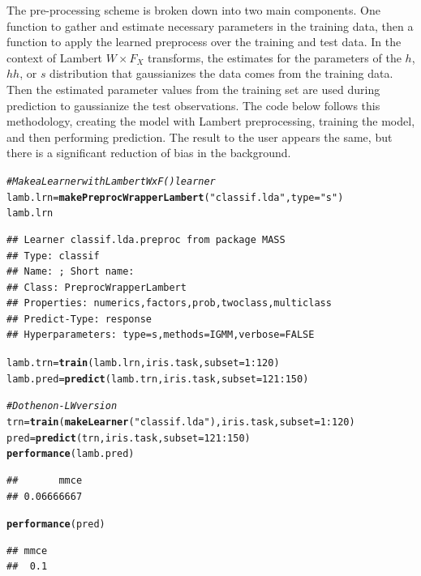 \documentclass[12pt]{article}\usepackage[]{graphicx}\usepackage[]{color}
\makeatletter
\newcommand{\hlnum}[1]{\textcolor[rgb]{0.686,0.059,0.569}{#1}}%
\newcommand{\hlstr}[1]{\textcolor[rgb]{0.192,0.494,0.8}{#1}}%
\newcommand{\hlcom}[1]{\textcolor[rgb]{0.678,0.584,0.686}{\textit{#1}}}%
\newcommand{\hlopt}[1]{\textcolor[rgb]{0,0,0}{#1}}%
\newcommand{\hlstd}[1]{\textcolor[rgb]{0.345,0.345,0.345}{#1}}%
\newcommand{\hlkwb}[1]{\textcolor[rgb]{0.69,0.353,0.396}{#1}}%
\newcommand{\hlkwc}[1]{\textcolor[rgb]{0.333,0.667,0.333}{#1}}%
\newcommand{\hlkwd}[1]{\textcolor[rgb]{0.737,0.353,0.396}{\textbf{#1}}}%
\newenvironment{kframe}{%
 \def\at@end@of@kframe{}%
 \ifinner\ifhmode%
  \def\at@end@of@kframe{\end{minipage}}%
  \begin{minipage}{\columnwidth}%
 \fi\fi%
 \def\FrameCommand##1{\hskip\@totalleftmargin \hskip-\fboxsep
 \colorbox{shadecolor}{##1}\hskip-\fboxsep
     \hskip-\linewidth \hskip-\@totalleftmargin \hskip\columnwidth}%
 \MakeFramed {\advance\hsize-\width
   \@totalleftmargin\z@ \linewidth\hsize
   \@setminipage}}%
 {\par\unskip\endMakeFramed%
 \at@end@of@kframe}
\newenvironment{knitrout}{}{} %
\theoremstyle{definition}
\makeatother
\begin{document}
The pre-processing scheme is broken down into two main components. One function to gather and estimate necessary parameters in the training data, then a function to apply the learned preprocess over the training and test data. In the context of Lambert $W\times F_X$ transforms, the estimates for the parameters of the $h$, $hh$, or $s$ distribution that gaussianizes the data comes from the training data. Then the estimated parameter values from the training set are used during prediction to gaussianize the test observations. The code below follows this methodology, creating the model with Lambert preprocessing, training the model, and then performing prediction. The result to the user appears the same, but there is a significant reduction of bias in the background.

\singlespacing
\begin{knitrout}
\color{fgcolor}\begin{kframe}
\begin{alltt}
\hlcom{# Make a Learner with Lambert WxF() learner}
\hlstd{lamb.lrn} \hlkwb{=} \hlkwd{makePreprocWrapperLambert}\hlstd{(}\hlstr{"classif.lda"}\hlstd{,} \hlkwc{type} \hlstd{=} \hlstr{"s"}\hlstd{)}
\hlstd{lamb.lrn}
\end{alltt}
\begin{verbatim}
## Learner classif.lda.preproc from package MASS
## Type: classif
## Name: ; Short name: 
## Class: PreprocWrapperLambert
## Properties: numerics,factors,prob,twoclass,multiclass
## Predict-Type: response
## Hyperparameters: type=s,methods=IGMM,verbose=FALSE
\end{verbatim}
\begin{alltt}
\hlstd{lamb.trn} \hlkwb{=} \hlkwd{train}\hlstd{(lamb.lrn,iris.task,} \hlkwc{subset} \hlstd{=} \hlnum{1}\hlopt{:}\hlnum{120}\hlstd{)}
\hlstd{lamb.pred} \hlkwb{=} \hlkwd{predict}\hlstd{(lamb.trn, iris.task,} \hlkwc{subset} \hlstd{=} \hlnum{121}\hlopt{:}\hlnum{150}\hlstd{)}

\hlcom{# Do the non-LW version}
\hlstd{trn} \hlkwb{=} \hlkwd{train}\hlstd{(}\hlkwd{makeLearner}\hlstd{(}\hlstr{"classif.lda"}\hlstd{),iris.task,} \hlkwc{subset} \hlstd{=} \hlnum{1}\hlopt{:}\hlnum{120}\hlstd{)}
\hlstd{pred} \hlkwb{=} \hlkwd{predict}\hlstd{(trn, iris.task,} \hlkwc{subset} \hlstd{=} \hlnum{121}\hlopt{:}\hlnum{150}\hlstd{)}
\hlkwd{performance}\hlstd{(lamb.pred)}
\end{alltt}
\begin{verbatim}
##       mmce 
## 0.06666667
\end{verbatim}
\begin{alltt}
\hlkwd{performance}\hlstd{(pred)}
\end{alltt}
\begin{verbatim}
## mmce 
##  0.1
\end{verbatim}
\end{kframe}
\end{knitrout}
\doublespacing
\end{document}
